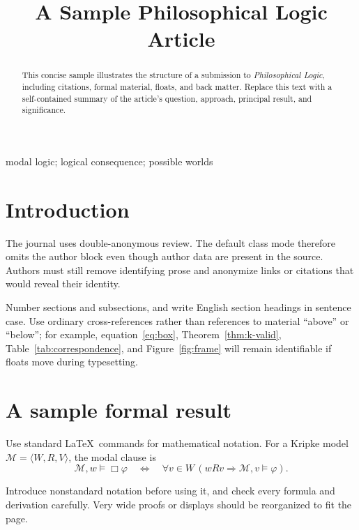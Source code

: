 \documentclass{PL}
\title[Sample Philosophical Logic Article]{A Sample Philosophical Logic Article}
\author[Author One \& Author Two]{%
  \spauthor{Author One\\
    \institute{Institution One}\\
    \small{\email{author.one@example.edu}}}
  \AND%
  \spauthor{Author Two\\
    \institute{Institution Two}\\
    \small{\email{author.two@example.edu}}}%
}
\theoremstyle{definition}
\begin{document}
\maketitle

\begin{abstract}
This concise sample illustrates the structure of a submission to \emph{Philosophical Logic}, including citations, formal material, floats, and back matter. Replace this text with a self-contained summary of the article's question, approach, principal result, and significance.
\end{abstract}

\begin{keywords}
modal logic; logical consequence; possible worlds
\end{keywords}

\section{Introduction}

The journal uses double-anonymous review. The default class mode therefore omits the author block even though author data are present in the source. Authors must still remove identifying prose and anonymize links or citations that would reveal their identity.

Number sections and subsections, and write English section headings in sentence case. Use ordinary cross-references rather than references to material ``above'' or ``below''; for example, equation~\eqref{eq:box}, Theorem~\ref{thm:k-valid}, Table~\ref{tab:correspondence}, and Figure~\ref{fig:frame} will remain identifiable if floats move during typesetting.

\section{A sample formal result}

Use standard \LaTeX\ commands for mathematical notation. For a Kripke model $\mathcal{M}=\langle W,R,V\rangle$, the modal clause is
\begin{equation}
  \mathcal{M},w \models \Box\varphi
  \quad\Longleftrightarrow\quad
  \forall v\in W\,(wRv\Rightarrow\mathcal{M},v\models\varphi).
  \label{eq:box}
\end{equation}

Introduce nonstandard notation before using it, and check every formula and derivation carefully. Very wide proofs or displays should be reorganized to fit the page.
\end{document}
